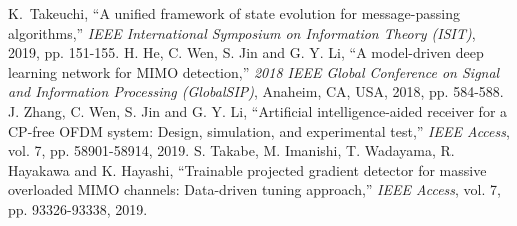 \documentclass[journal]{IEEEtran}
\begin{document}
\begin{thebibliography}{1}
K.~Takeuchi, ``A unified framework of state evolution for message-passing algorithms,'' \textit{IEEE International Symposium on Information Theory (ISIT)}, 2019, pp. 151-155.
H. He, C. Wen, S. Jin and G. Y. Li, ``A model-driven deep learning network for MIMO detection,'' \textit{2018 IEEE Global Conference on Signal and Information Processing (GlobalSIP)}, Anaheim, CA, USA, 2018, pp. 584-588.
J. Zhang, C. Wen, S. Jin and G. Y. Li, ``Artificial intelligence-aided receiver for a CP-free OFDM system: Design, simulation, and experimental test,'' \textit{IEEE Access}, vol. 7, pp. 58901-58914, 2019.
S. Takabe, M. Imanishi, T. Wadayama, R. Hayakawa and K. Hayashi, ``Trainable projected gradient detector for massive overloaded MIMO channels: Data-driven tuning approach,'' \textit{IEEE Access}, vol. 7, pp. 93326-93338, 2019.


\end{thebibliography}
\end{document}
